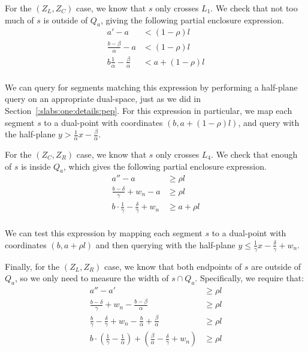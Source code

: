 For the $(Z_L, Z_C)$ case, we know that $s$ only crosses $L_1$.
We check that not too much of $s$ is outside of $Q_a$, giving the following partial enclosure expression.
\[
\begin{split}
a' - a &< (1 - \rho)l \\
%
\frac{b - \beta}{\alpha} - a &< (1 - \rho)l \\
%
b \frac{1}{\alpha} - \frac{\beta}{\alpha} &< a + (1 - \rho)l \\
%
\end{split}
\]

\noindent We can query for segments matching this expression by performing a half-plane query on an appropriate dual-space, just as we did in Section~\ref{:slabs:one:details:pep}. 
For this expression in particular, we map each segment $s$ to a dual-point with coordinates $(b, a + (1-\rho)l)$, and query with the half-plane $y > \frac{1}{\alpha} x - \frac{\beta}{\alpha}$.

For the $(Z_C, Z_R)$ case, we know that $s$ only crosses $L_4$. 
We check that enough of $s$ is inside $Q_a$, which gives the following partial enclosure expression.
\[
\begin{split}
a'' - a &\geq \rho l \\
%
\frac{b - \delta}{\gamma} + w_n - a &\geq \rho l \\
%
b \cdot \frac{1}{\gamma} - \frac{\delta}{\gamma} + w_n &\geq a + \rho l \\
%
\end{split}
\]

\noindent We can test this expression by mapping each segment $s$ to a dual-point with coordinates $(b, a + \rho l)$ and then querying with the half-plane $y \leq \frac{1}{\gamma} x - \frac{\delta}{\gamma} + w_n$.

Finally, for the $(Z_L, Z_R)$ case, we know that both endpoints of $s$ are outside of $Q_a$, so we only need to measure the width of $s \cap Q_a$.  
Specifically, we require that:
\[
\begin{split} 
a'' - a' &\geq \rho l \\
%
\frac{b - \delta}{\gamma} + w_n - \frac{b - \beta}{\alpha} &\geq \rho l \\
%
\frac{b}{\gamma} - \frac{\delta}{\gamma} + w_n - \frac{b}{\alpha} + \frac{\beta}{\alpha} &\geq \rho l \\
%
b \cdot \left ( \frac{1}{\gamma} - \frac{1}{\alpha} \right ) + \left ( \frac{\beta}{\alpha} - \frac{\delta}{\gamma} + w_n \right ) &\geq \rho l \\
%
\end{split}
\]

